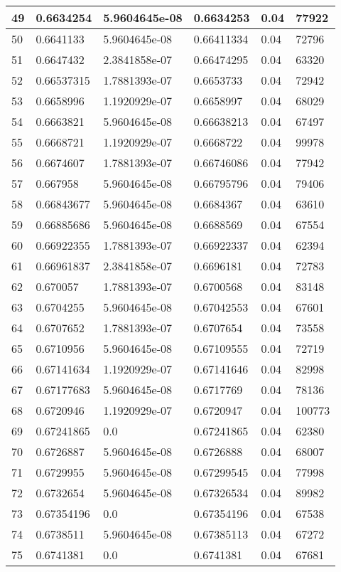 \begin{longtable}{|l|l|l|l|l|l|}
49 & 0.6634254 & 5.9604645e-08 & 0.6634253 & 0.04 & 77922 \\ \hline 
50 & 0.6641133 & 5.9604645e-08 & 0.66411334 & 0.04 & 72796 \\ \hline 
51 & 0.6647432 & 2.3841858e-07 & 0.66474295 & 0.04 & 63320 \\ \hline 
52 & 0.66537315 & 1.7881393e-07 & 0.6653733 & 0.04 & 72942 \\ \hline 
53 & 0.6658996 & 1.1920929e-07 & 0.6658997 & 0.04 & 68029 \\ \hline 
54 & 0.6663821 & 5.9604645e-08 & 0.66638213 & 0.04 & 67497 \\ \hline 
55 & 0.6668721 & 1.1920929e-07 & 0.6668722 & 0.04 & 99978 \\ \hline 
56 & 0.6674607 & 1.7881393e-07 & 0.66746086 & 0.04 & 77942 \\ \hline 
57 & 0.667958 & 5.9604645e-08 & 0.66795796 & 0.04 & 79406 \\ \hline 
58 & 0.66843677 & 5.9604645e-08 & 0.6684367 & 0.04 & 63610 \\ \hline 
59 & 0.66885686 & 5.9604645e-08 & 0.6688569 & 0.04 & 67554 \\ \hline 
60 & 0.66922355 & 1.7881393e-07 & 0.66922337 & 0.04 & 62394 \\ \hline 
61 & 0.66961837 & 2.3841858e-07 & 0.6696181 & 0.04 & 72783 \\ \hline 
62 & 0.670057 & 1.7881393e-07 & 0.6700568 & 0.04 & 83148 \\ \hline 
63 & 0.6704255 & 5.9604645e-08 & 0.67042553 & 0.04 & 67601 \\ \hline 
64 & 0.6707652 & 1.7881393e-07 & 0.6707654 & 0.04 & 73558 \\ \hline 
65 & 0.6710956 & 5.9604645e-08 & 0.67109555 & 0.04 & 72719 \\ \hline 
66 & 0.67141634 & 1.1920929e-07 & 0.67141646 & 0.04 & 82998 \\ \hline 
67 & 0.67177683 & 5.9604645e-08 & 0.6717769 & 0.04 & 78136 \\ \hline 
68 & 0.6720946 & 1.1920929e-07 & 0.6720947 & 0.04 & 100773 \\ \hline 
69 & 0.67241865 & 0.0 & 0.67241865 & 0.04 & 62380 \\ \hline 
70 & 0.6726887 & 5.9604645e-08 & 0.6726888 & 0.04 & 68007 \\ \hline 
71 & 0.6729955 & 5.9604645e-08 & 0.67299545 & 0.04 & 77998 \\ \hline 
72 & 0.6732654 & 5.9604645e-08 & 0.67326534 & 0.04 & 89982 \\ \hline 
73 & 0.67354196 & 0.0 & 0.67354196 & 0.04 & 67538 \\ \hline 
74 & 0.6738511 & 5.9604645e-08 & 0.67385113 & 0.04 & 67272 \\ \hline 
75 & 0.6741381 & 0.0 & 0.6741381 & 0.04 & 67681 \\ \hline 
\end{longtable}